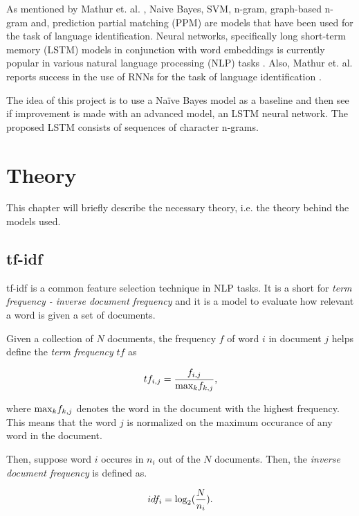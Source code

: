 \documentclass[conference]{IEEEtran}
\begin{document}
As mentioned by Mathur et. al. \cite{lide}, Naive
Bayes, SVM, n-gram, graph-based n-gram and,
prediction partial matching (PPM) are models that have been used for the task of language identification. Neural networks, specifically long short-term memory (LSTM) models in conjunction with word embeddings is currently popular in various natural language processing (NLP) tasks \cite{twitter, boundary, intent}. Also, Mathur et. al. reports success in the use of RNNs for the task of language identification \cite{lide}.

The idea of this project is to use a Naïve Bayes model as a baseline and then see if improvement is made with an advanced model, an LSTM neural network. The proposed LSTM consists of sequences of character n-grams.


 

\section{Theory}
This chapter will briefly describe the necessary theory, i.e. the theory behind the models used.

\subsection{tf-idf}
tf-idf is a common feature selection technique in NLP tasks. It is a short for \textit{term frequency - inverse document frequency} and it is a model to evaluate how relevant a word is given a set of documents.

Given a collection of $N$ documents, the frequency $f$ of word $i$ in document $j$ helps define the \textit{term frequency} $tf$ as 

$$tf_{i,j}= \frac{f_{i,j}}{\textnormal{max}_k f_{k,j}} \textnormal{,}$$

where $\textnormal{max}_kf_{k,j}$ denotes the word in the document with the highest frequency. This means that the word $j$ is normalized on the maximum occurance of any word in the document.


Then, suppose word $i$ occures in $n_i$ out of the $N$ documents. Then, the \textit{inverse document frequency} is defined as.

$$idf_i = \log_2(\frac{N}{n_i})\textnormal{.}$$
\end{document}
